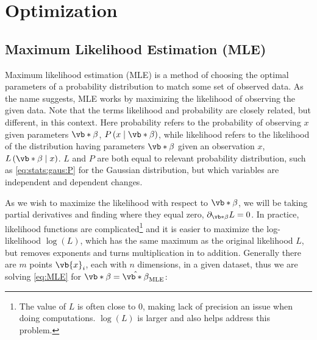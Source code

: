 \chapter{Optimization}
\label{chap:opt}

\section{Maximum Likelihood Estimation (MLE)}
\label{opt:MLE}

Maximum likelihood estimation (MLE) is a method
of choosing the optimal parameters of a probability distribution
to match some set of observed data.
As the name suggests, MLE works by maximizing the likelihood of observing the given data.
Note that the terms likelihood and probability are closely related, but different, in this context.
Here probability refers to the probability of observing $x$ given parameters $\vb*{\beta}$, $P\left(x \mid \vb*{\beta}\right)$,
while likelihood refers to the likelihood of the distribution having parameters $\vb*{\beta}$ given an observation $x$, $L\left(\vb*{\beta} \mid x\right)$.
$L$ and $P$ are both equal to relevant probability distribution,
such as \cref{eq:stats:gaus:P} for the Gaussian distribution,
but which variables are independent and dependent changes.

As we wish to maximize the likelihood with respect to $\vb*{\beta}$,
we will be taking partial derivatives and finding where they equal zero, $\partial_{\vb*{\beta}} L = 0$.
In practice, likelihood functions are complicated\footnote{The value of $L$
is often close to $0$, making lack of precision an issue when doing computations.
$\log\left(L\right)$ is larger and also helps address this problem.} and
it is easier to maximize the log-likelihood $\log\left(L\right)$,
which has the same maximum as the original likelihood $L$,
but removes exponents and turns multiplication in to addition.
Generally there are $m$ points $\vb{x}_{i}$, each with $n$ dimensions, in a given dataset,
thus we are solving \cref{eq:MLE} for $\vb*{\beta} = \hat{\vb*{\beta}}_{\text{MLE}}$:

